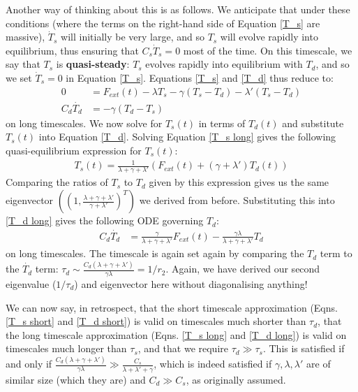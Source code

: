 Another way of thinking about this is as follows. We anticipate that under these conditions (where the terms on the right-hand side of Equation \ref{T_s} are massive), $\dot T_s$ will initially be very large, and so $T_s$ will evolve rapidly into equilibrium, thus ensuring that $C_s \dot T_s=0$ most of the time. On this timescale, we say that $T_s$ is \textbf{quasi-steady}: $T_s$ evolves rapidly into equilibrium with $T_d$, and so we set $\dot T_s=0$ in Equation \ref{T_s}. Equations \ref{T_s} and \ref{T_d} thus reduce to:
\begin{align}
    0 & = F_{ext}(t)-\lambda T_s -\gamma (T_s-T_d) - \lambda'(T_s-T_d) \label{T_s long} \\ 
    C_d \dot{T_d} &= -\gamma (T_d-T_s) \label{T_d long}
\end{align}
on long timescales. We now solve for $T_s(t)$ in terms of $T_d(t)$ and substitute $T_s(t)$ into Equation \ref{T_d}. Solving Equation \ref{T_s long} gives the following quasi-equilibrium expression for $T_s(t)$:
\begin{align*}
    T_s(t)=\frac{1}{\lambda+\gamma+\lambda'}\left(F_{ext}(t)+(\gamma+\lambda ')T_d(t)\right)
\end{align*}
Comparing the ratios of $T_s$ to $T_d$ given by this expression gives us the same eigenvector $\left( \left( 1,\frac{\lambda+\gamma+\lambda'}{\gamma+\lambda'} \right)^T \right)$ we derived from before. Substituting this into \ref{T_d long} gives the following ODE governing $T_d$:
\begin{align}
    C_d \dot{T_d} &= \frac{\gamma}{\lambda+\gamma+\lambda'}F_{ext}(t) - \frac{\gamma\lambda}{\lambda+\gamma+\lambda'}T_d\label{T_d long T_s} 
\end{align}
on long timescales. The timescale is again set again by comparing the $T_d$ term to the $\dot{T_d}$ term: $\tau_d\sim \frac{C_d(\lambda+\gamma+\lambda')}{\gamma\lambda}=1/r_2$. Again, we have derived our second eigenvalue ($1/\tau_d$) and eigenvector here without diagonalising anything!

We can now say, in retrospect, that the short timescale approximation (Eqns. \ref{T_s short} and \ref{T_d short}) is valid on timescales much shorter than $\tau_d$, that the long timescale approximation (Eqns. \ref{T_s long} and \ref{T_d long}) is valid on timescales much longer than $\tau_s$, and that we require $\tau_d\gg \tau_s$. This is satisfied if and only if $\frac{C_d(\lambda+\gamma+\lambda')}{\gamma\lambda}\gg\frac{C_s}{\lambda+\lambda'+\gamma}$, which is indeed satisfied if $\gamma,\lambda,\lambda'$ are of similar size (which they are) and $C_d\gg C_s$, as originally assumed.

